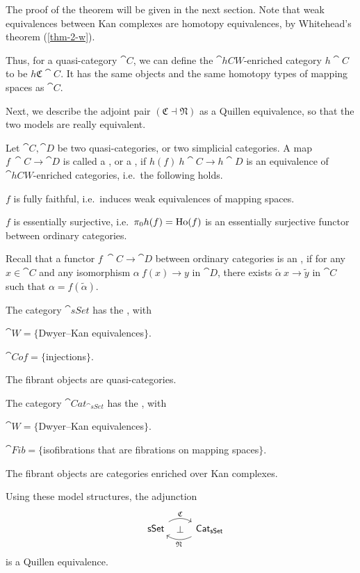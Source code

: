 The proof of the theorem will be given in the next section.
Note that weak equivalences between Kan complexes
are homotopy equivalences,
by Whitehead's theorem (\ref{thm-2-w}).

Thus, for a quasi-category $\cat C$, we can define the 
$\cat{hCW}$-enriched category $h\cat C$ to be $h\mathfrak C\cat C$.
It has the same objects and the same homotopy types of mapping spaces as $\cat C$.

Next, we describe the adjoint pair $(\mathfrak C\dashv\mathfrak N)$
as a Quillen equivalence,
so that the two models are really equivalent.

\begin{definition}
    Let $\cat C,\cat D$ be two quasi-categories, or two simplicial categories.
    A map $f\:\cat C\to\cat D$ is called a ,
    or a , if $h(f)\:h\cat C\to h\cat D$
    is an equivalence of $\cat{hCW}$-enriched categories, i.e.\ the following holds.
    \begin{itms}
        \item $f$ is fully faithful, i.e.\ induces weak equivalences of mapping spaces.
        \item $f$ is essentially surjective, i.e.\ $\pi_0h(f)=\operatorname{Ho}(f)$
        is an essentially surjective functor between ordinary categories.
    \end{itms}
\end{definition}

Recall that a functor $f\:\cat C\to\cat D$ between ordinary categories is an ,
if for any $x\in\cat C$ and any isomorphism $\alpha\:f(x)\to y$ in $\cat D$,
there exists $\tilde\alpha\:x\to\tilde y$ in $\cat C$ such that $\alpha=f(\tilde\alpha)$.

\begin{theorem}
    The category $\cat{sSet}$ has the , with 
    \begin{itms}
        \item $\cat W=\{$Dwyer--Kan equivalences$\}$.
        \item $\cat{Cof}=\{$injections$\}$.
        \item The fibrant objects are quasi-categories.
    \end{itms}
    The category $\cat{Cat}_{\cat{sSet}}$ has the , with
    \begin{itms}
        \item $\cat W=\{$Dwyer--Kan equivalences$\}$.
        \item $\cat{Fib}=\{$isofibrations that are fibrations on mapping spaces$\}$.
        \item The fibrant objects are categories enriched over Kan complexes.
    \end{itms}
    Using these model structures, the adjunction
    \[\begin{tikzcd}
        \cat{sSet}\ar[r,bend left,"\mathfrak C"]\ar[r,phantom,"\bot"] &
        \rlap{$\cat{Cat}_{\cat{sSet}}$}\phantom{\cat{sSet}}\ar[l,bend left,"\mathfrak N"]
    \end{tikzcd}\]
    is a Quillen equivalence.
\end{theorem}

